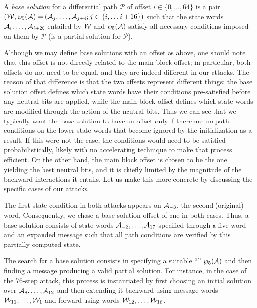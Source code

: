 \begin{defi}
A \emph{base solution} for a differential path $\mathcal{P}$ of offset $i \in \{0,\ldots,64\}$ is a pair $(\mathcal{W},  \wp_5(\mathcal{A}) = (\mathcal{A}_{j},\ldots,\mathcal{A}_{j+4}; j \in \{i,\ldots i + 16\})$
such that the state words $\mathcal{A}_i, \ldots, \mathcal{A}_{i+20}$ entailed by $\mathcal{W}$ and $\wp_5(\mathcal{A})$ satisfy all necessary conditions imposed on them by $\mathcal{P}$ (\ie is a partial solution for $\mathcal{P}$).
\end{defi}

Although we may define base solutions with an offset as above, one should note that this offset is not directly related to the main block offset; in particular, both offsets do not need to be equal, and they
are indeed different in our attacks. The reason of that difference is that the two offsets represent different things: the base solution offset defines which state words have their conditions pre-satisfied
before any neutral bits are applied, while the main block offset defines which state words are modified through the action of the neutral bits. Thus we can see that we typically want the base solution
to have an offset only if there are no path conditions on the lower state words that become ignored by the initialization as a result. If this were not the case, the conditions would need to be
satisfied probabilistically, likely with no accelerating technique to make that process efficient. On the other hand, the main block offset is chosen to be the one yielding the best neutral bits, and
it is chiefly limited by the magnitude of the backward interactions it entails.
Let us make this more concrete by discussing the specific cases of our attacks.

\medskip

The first state condition in both attacks appears on $\mathcal{A}_{-3}$, \ie the second (original) \iv word. Consequently, we chose a base solution offset of one in both cases. 
Thus, a base solution consists of state words $\mathcal{A}_{-3},\ldots,\mathcal{A}_{17}$ specified through a five-word \iv and an expanded message such that all path conditions are verified by
this partially computed state.

The search for a base solution consists in specifying a suitable ``\iv'' $\wp_5(\mathcal{A})$ and then finding a message producing a valid partial solution. For instance, in the case of the 76-step
attack, this process is instantiated by first choosing an initial solution over $\mathcal{A}_8,\ldots,\mathcal{A}_{12}$ and then extending it backward using message words $\mathcal{W}_{11},\ldots,\mathcal{W}_1$
and forward using words $\mathcal{W}_{12},\ldots,\mathcal{W}_{16}$.

